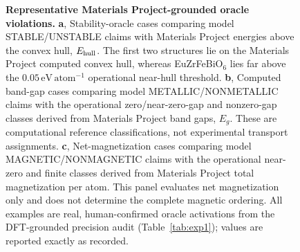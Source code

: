 \documentclass[pdflatex,sn-nature]{sn-jnl}
\newcommand{\rev}[1]{#1}
\newcommand{\rev}[1]{{\color{blue}#1}}
\begin{document}
\begin{figure}[!htbp]

\caption{\justifying\textbf{Representative Materials Project-grounded oracle
violations.}
\textbf{a}, Stability-oracle cases comparing model STABLE/UNSTABLE claims with
Materials Project energies above the convex hull, $E_{\rm hull}$. The first two
structures lie on the Materials Project computed convex hull, whereas
EuZrFeBiO$_6$ lies far above the
$0.05\,\mathrm{eV\,atom^{-1}}$ operational near-hull threshold.
\textbf{b}, Computed band-gap cases comparing model METALLIC/NONMETALLIC claims
with the operational zero/near-zero-gap and nonzero-gap classes derived from
Materials Project band gaps, $E_g$. These are computational reference
classifications, not experimental transport assignments.
\textbf{c}, Net-magnetization cases comparing model MAGNETIC/NONMAGNETIC claims
with the operational near-zero and finite classes derived from Materials Project
total magnetization per atom. This panel evaluates net magnetization only and
does not determine the complete magnetic ordering. All examples are real,
human-confirmed oracle activations from the \rev{DFT-grounded precision audit (Table~\ref{tab:exp1})};
values are reported exactly as recorded.}
\label{fig:dft-oracle-cases}
\end{figure}
\end{document}
